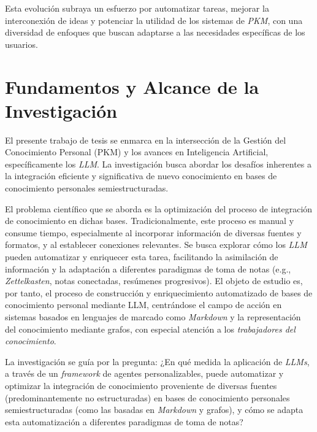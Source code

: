 Esta evolución subraya un esfuerzo por automatizar tareas, mejorar la interconexión de ideas y potenciar la utilidad de los sistemas de \textit{PKM}, con una diversidad de enfoques que buscan adaptarse a las necesidades específicas de los usuarios.

\section{Fundamentos y Alcance de la Investigación}
\label{sec:fundamentos_investigacion}
El presente trabajo de tesis se enmarca en la intersección de la Gestión del Conocimiento Personal (PKM) y los avances en Inteligencia Artificial, específicamente los \textit{LLM}. La investigación busca abordar los desafíos inherentes a la integración eficiente y significativa de nuevo conocimiento en bases de conocimiento personales semiestructuradas.

El problema científico que se aborda es la optimización del proceso de integración de conocimiento en dichas bases. Tradicionalmente, este proceso es manual y consume tiempo, especialmente al incorporar información de diversas fuentes y formatos, y al establecer conexiones relevantes. Se busca explorar cómo los \textit{LLM} pueden automatizar y enriquecer esta tarea, facilitando la asimilación de información y la adaptación a diferentes paradigmas de toma de notas (e.g., \textit{Zettelkasten}, notas conectadas, resúmenes progresivos). El objeto de estudio es, por tanto, el proceso de construcción y enriquecimiento automatizado de bases de conocimiento personal mediante LLM, centrándose el campo de acción en sistemas basados en lenguajes de marcado como \textit{Markdown} y la representación del conocimiento mediante grafos, con especial atención a los \textit{trabajadores del conocimiento}.

La investigación se guía por la pregunta: ¿En qué medida la aplicación de \textit{LLMs}, a través de un \textit{framework} de agentes personalizables, puede automatizar y optimizar la integración de conocimiento proveniente de diversas fuentes (predominantemente no estructuradas) en bases de conocimiento personales semiestructuradas (como las basadas en \textit{Markdown} y grafos), y cómo se adapta esta automatización a diferentes paradigmas de toma de notas?

